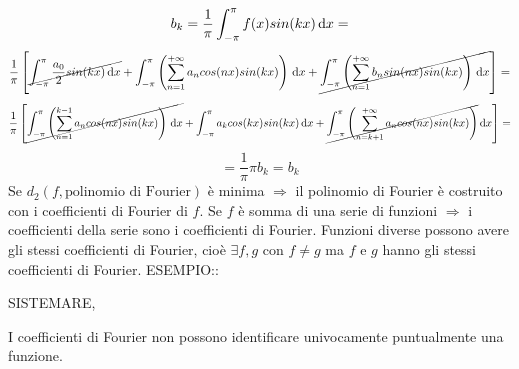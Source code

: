$$b_k=\frac{1}{\pi}\int_{-\pi}^{\pi}f(x)sin(kx)\,\mathrm{d}{x}=$$
$$\frac{1}{\pi}\left[
\cancel{\int_{-\pi}^{\pi}\frac{a_0}{2}sin(kx)\,\mathrm{d}{x}}+
\int_{-\pi}^{\pi}\left(\sum\limits_{n=1}^{+\infty}a_ncos(nx)sin(kx)\right)\,\mathrm{d}{x}+
\cancel{\int_{-\pi}^{\pi}\left(\sum\limits_{n=1}^{+\infty}b_nsin(nx)sin(kx)\right)\,\mathrm{d}{x}}
\right]=$$
$$\frac{1}{\pi}\left[
\cancel{\int_{-\pi}^{\pi}\left(\sum\limits_{n=1}^{k-1} a_ncos(nx)sin(kx)\right)\,\mathrm{d}{x}}+
\int_{-\pi}^{\pi}a_kcos(kx)sin(kx)\,\mathrm{d}{x}+
\cancel{\int_{-\pi}^{\pi}\left(\sum\limits_{n=k+1}^{+\infty}a_ncos(nx)sin(kx)\right)}\,\mathrm{d}{x}
\right]=$$
$$=\frac{1}{\pi}\pi b_k=b_k$$
\observation
Se $d_2(f,\text{polinomio di Fourier})$ \`{e} minima $\Rightarrow$ il polinomio di Fourier \`{e} costruito con i coefficienti di Fourier di $f$.
\observation
Se $f$ \`{e} somma di una serie di funzioni $\Rightarrow$ i coefficienti della serie sono i coefficienti di Fourier.
\observation
Funzioni diverse possono avere gli stessi coefficienti di Fourier, cio\`{e} $\exists f,g$ con $f\ne g$ ma $f$ e $g$  hanno gli stessi coefficienti di Fourier.
ESEMPIO::
\begin{center}
	SISTEMARE,
\end{center}
\observation
I coefficienti di Fourier non possono identificare univocamente puntualmente una funzione.
